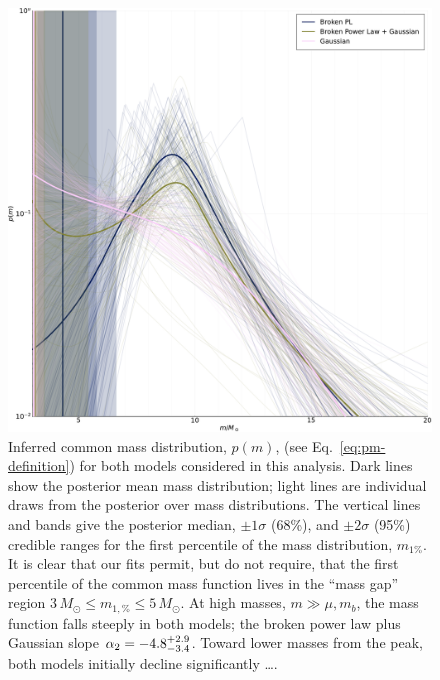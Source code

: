 \documentclass[modern]{aastex631}
\begin{document}
\begin{figure}
    \includegraphics[width=\columnwidth]{figures/pm_traces.pdf}
    \caption{\label{fig:pm-traces} Inferred common mass distribution, $p(m)$,
    (see Eq.~\eqref{eq:pm-definition}) for both models considered in this
    analysis.  Dark lines show the posterior mean mass distribution; light lines
    are individual draws from the posterior over mass distributions.  The
    vertical lines and bands give the posterior median, $\pm 1 \sigma$ (68\%),
    and $\pm 2\sigma$ (95\%) credible ranges for the first percentile of the
    mass distribution, $m_{1\%}$.  It is clear that our fits permit, but do not
    require, that the first percentile of the common mass function lives in the
    ``mass gap'' region $3 \, M_\odot \leq m_{1,\%} \leq 5 \, M_\odot$.  At high
    masses, $m \gg \mu, m_b$, the mass function falls steeply in both models;
    the broken power law plus Gaussian slope $\alpha_2 = -4.8^{+2.9}_{-3.4}$.
    Toward lower masses from the peak, both models initially decline
    significantly \ldots.}
\end{figure}
\end{document}
